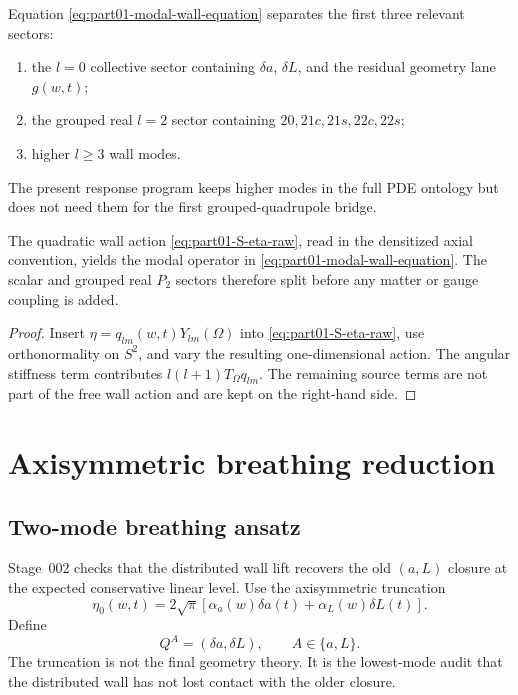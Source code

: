 Equation \eqref{eq:part01-modal-wall-equation} separates the first three relevant sectors:
\begin{enumerate}[leftmargin=2.2em]
\item the \(l=0\) collective sector containing \(\delta a\), \(\delta L\), and the residual geometry lane \(g(w,t)\);
\item the grouped real \(l=2\) sector containing \(20,21c,21s,22c,22s\);
\item higher \(l\ge3\) wall modes.
\end{enumerate}
The present response program keeps higher modes in the full PDE ontology but does not need them for the first grouped-quadrupole bridge.

\begin{proposition}
\label{prop:part01-wall-modal-backbone}
The quadratic wall action \eqref{eq:part01-S-eta-raw}, read in the densitized axial convention, yields the modal operator in \eqref{eq:part01-modal-wall-equation}.  The scalar and grouped real \(P_2\) sectors therefore split before any matter or gauge coupling is added.
\end{proposition}

\begin{proof}
Insert \(\eta=q_{lm}(w,t)Y_{lm}(\Omega)\) into \eqref{eq:part01-S-eta-raw}, use orthonormality on \(S^2\), and vary the resulting one-dimensional action.  The angular stiffness term contributes \(l(l+1)T_\Omega q_{lm}\).  The remaining source terms are not part of the free wall action and are kept on the right-hand side.
\end{proof}

\section{Axisymmetric breathing reduction}
\label{sec:part01_parent_geometry:axisymmetric-breathing-reduction}

\subsection{Two-mode breathing ansatz}
\label{subsec:part01-breathing-ansatz}

Stage~002 checks that the distributed wall lift recovers the old \((a,L)\) closure at the expected conservative linear level.  Use the axisymmetric truncation
\begin{equation}
\label{eq:part01-breathing-ansatz}
\eta_0(w,t)
=
2\sqrt\pi\left[\alpha_a(w)\delta a(t)+\alpha_L(w)\delta L(t)\right].
\end{equation}
Define
\begin{equation}
Q^A=(\delta a,\delta L),
\qquad
A\in\{a,L\}.
\end{equation}
The truncation is not the final geometry theory.  It is the lowest-mode audit that the distributed wall has not lost contact with the older closure.

